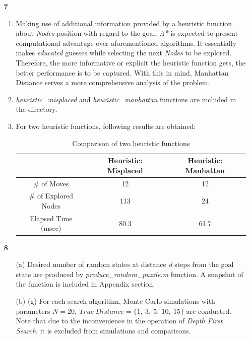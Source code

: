 \documentclass[12pt]{article}
\begin{document}
\begin{enumerate}
	\item [\textbf{7}]
	\begin{enumerate}
		\item 	Making use of additional information provided by a heuristic function about \textit{Nodes} position with regard to the goal, \textit{A*} is expected to present computational advantage over aforementioned algorithms. 
		It essentially makes \textit{educated} guesses while selecting the next \textit{Nodes} to be explored. 
		Therefore, the more informative or explicit the heuristic function gets, the better performance is to be captured.
		With this in mind, Manhattan Distance serves a more comprehensive analysis of the problem.
		\item \textit{heuristic\_misplaced} and \textit{heuristic\_manhattan} functions are included in the directory.
		\item For two heuristic functions, following results are obtained:
		\begin{table}[h]
			\centering
			\caption{Comparison of two heuristic functions}
			\label{table: A* Comparison}
			\begin{tabular}{@{}ccc@{}}
				\toprule
				& Heuristic: Misplaced & Heuristic: Manhattan \\ \midrule
				\# of Moves          & 12                   & 12                   \\
				\# of Explored Nodes & 113                  & 24                   \\
				Elapsed Time (msec)  & 80.3                 & 61.7                 \\ \bottomrule
			\end{tabular}
		\end{table}
		
		\end{enumerate}
	
	\item [\textbf{8}]
	\begin{enumerate}
		\item [(a)] Desired number of random states at distance \textit{d} steps from the goal state are produced by \textit{produce\_random\_puzzle.m} function. A snapshot of the function is included in Appendix section.
		\item [(b)-(g)] For each search algorithm, Monte Carlo simulations with parameters \newline$ N=20,\ True\ Distance = \{1,\ 3,\ 5,\ 10,\ 15\}$ are conducted. 
		Note that due to the inconvenience in the operation of \textit{Depth First Search}, it is excluded from simulations and comparisons.
		

\end{enumerate}
\end{enumerate}
\end{document}
